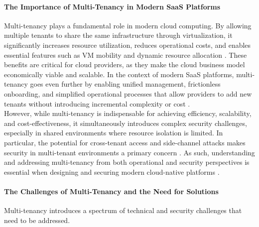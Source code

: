 \documentclass[11pt, a4paper, oneside, draft]{scrartcl}
\begin{document}
            \paragraph{The Importance of Multi-Tenancy in Modern SaaS Platforms}
                Multi-tenancy plays a fundamental role in modern cloud computing. 
                By allowing multiple tenants to share the same infrastructure through
                virtualization, it significantly increases resource utilization, reduces operational
                costs, and enables essential features such as VM mobility and dynamic resource
                allocation \parencite[pp.~345--346]{aljahdali2014}. 
                These benefits are critical for cloud providers, as they make the cloud business
                model economically viable and scalable. 
                In the context of modern SaaS platforms, multi-tenancy goes even further by enabling
                unified management, frictionless onboarding, and simplified operational processes
                that allow providers to add new tenants without introducing incremental complexity
                or cost \parencite[pp.~9--11]{awsSaaSArchitectureFundamentals}.
                \\
                However, while multi-tenancy is indispensable for achieving efficiency, scalability,
                and cost-effectiveness, it simultaneously introduces complex security challenges,
                especially in shared environments where resource isolation is limited. 
                In particular, the potential for cross-tenant access and side-channel attacks makes
                security in multi-tenant environments a primary concern
                \parencite[pp.~345--346]{aljahdali2014}. 
                As such, understanding and addressing multi-tenancy from both operational and
                security perspectives is essential when designing and securing modern cloud-native
                platforms
                \parencites[pp.~9--11]{awsSaaSArchitectureFundamentals}[p.~4]{isoConcepts}.

            \paragraph{The Challenges of Multi-Tenancy and the Need for Solutions}
                Multi-tenancy introduces a spectrum of technical and security challenges that need
                to be addressed.
\end{document}
